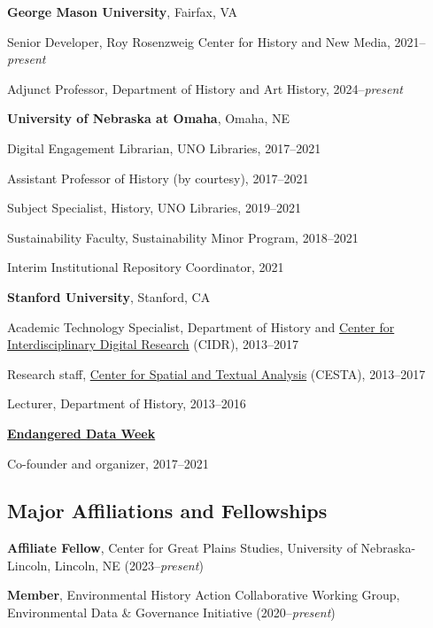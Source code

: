 \documentclass[10pt]{article}
\begin{document}
\textbf{George Mason University}, Fairfax, VA

\quad Senior Developer, Roy Rosenzweig Center for History and New Media, 2021--\textit{present}

\quad Adjunct Professor, Department of History and Art History, 2024--\textit{present}

\vspace{.4cm}

\textbf{University of Nebraska at Omaha}, Omaha, NE

\quad Digital Engagement Librarian, UNO Libraries, 2017--2021

\quad Assistant Professor of History (by courtesy), 2017--2021

\quad Subject Specialist, History, UNO Libraries, 2019--2021

\quad Sustainability Faculty, Sustainability Minor Program, 2018--2021

\quad Interim Institutional Repository Coordinator, 2021

\vspace{.4cm}

\textbf{Stanford University}, Stanford, CA

\quad Academic Technology Specialist, Department of History and \href{http://cidr.stanford.edu}{Center for Interdisciplinary Digital Research} (CIDR), 2013--2017

\quad Research staff, \href{http://cesta.stanford.edu}{Center for Spatial and Textual Analysis} (CESTA), 2013--2017

\quad Lecturer, Department of History, 2013--2016

\vspace{.4cm}

\textbf{\href{https://endangereddataweek.org}{Endangered Data Week}}

\quad Co-founder and organizer, 2017--2021

\vspace{0.2cm}

\subsection*{Major Affiliations and Fellowships}

\textbf{Affiliate Fellow}, Center for Great Plains Studies, University of Nebraska-Lincoln, Lincoln, NE (2023--\textit{present})

\textbf{Member}, Environmental History Action Collaborative Working Group, Environmental Data \& Governance Initiative (2020--\textit{present})
\end{document}
